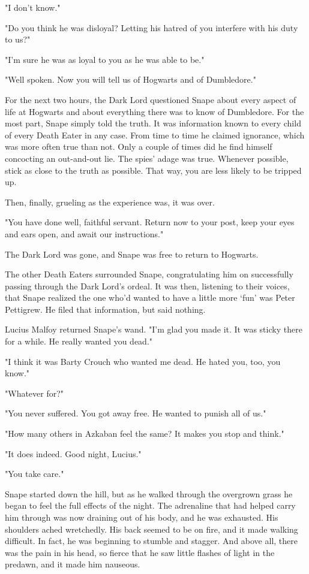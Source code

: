 "I don't know."

"Do you think he was disloyal? Letting his hatred of you interfere with his duty to us?"

"I'm sure he was as loyal to you as he was able to be."

"Well spoken. Now you will tell us of Hogwarts and of Dumbledore."

For the next two hours, the Dark Lord questioned Snape about every aspect of life at Hogwarts and about everything there was to know of Dumbledore. For the most part, Snape simply told the truth. It was information known to every child of every Death Eater in any case. From time to time he claimed ignorance, which was more often true than not. Only a couple of times did he find himself concocting an out-and-out lie. The spies' adage was true. Whenever possible, stick as close to the truth as possible. That way, you are less likely to be tripped up.

Then, finally, grueling as the experience was, it was over.

"You have done well, faithful servant. Return now to your post, keep your eyes and ears open, and await our instructions."

The Dark Lord was gone, and Snape was free to return to Hogwarts.

The other Death Eaters surrounded Snape, congratulating him on successfully passing through the Dark Lord's ordeal. It was then, listening to their voices, that Snape realized the one who'd wanted to have a little more `fun' was Peter Pettigrew. He filed that information, but said nothing.

Lucius Malfoy returned Snape's wand. "I'm glad you made it. It was sticky there for a while. He really wanted you dead."

"I think it was Barty Crouch who wanted me dead. He hated you, too, you know."

"Whatever for?"

"You never suffered. You got away free. He wanted to punish all of us."

"How many others in Azkaban feel the same? It makes you stop and think."

"It does indeed. Good night, Lucius."

"You take care."

Snape started down the hill, but as he walked through the overgrown grass he began to feel the full effects of the night. The adrenaline that had helped carry him through was now draining out of his body, and he was exhausted. His shoulders ached wretchedly. His back seemed to be on fire, and it made walking difficult. In fact, he was beginning to stumble and stagger. And above all, there was the pain in his head, so fierce that he saw little flashes of light in the predawn, and it made him nauseous.

